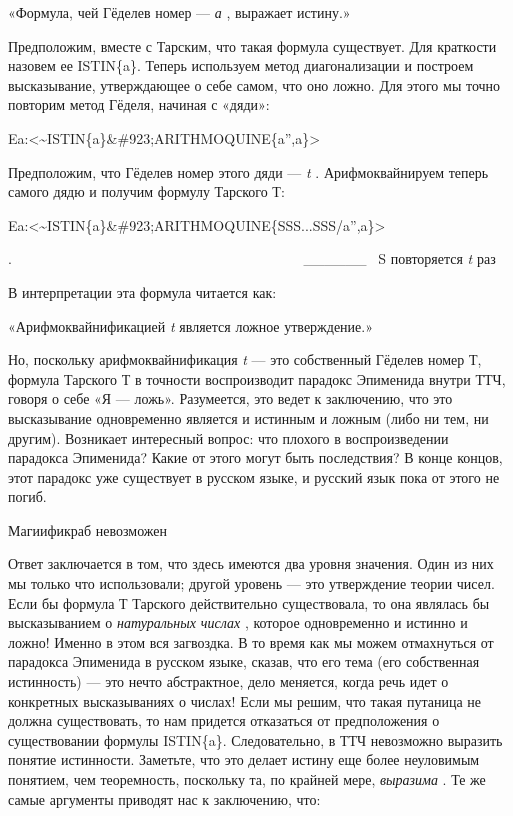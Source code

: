 \documentclass[../main.tex]{subfiles}
\begin{document}
«Формула, чей Гёделев номер --- \emph{а} , выражает истину.»

Предположим, вместе с Тарским, что такая формула существует. Для краткости назовем ее ISTIN\{a\}. Теперь используем метод диагонализации и построем высказывание, утверждающее о себе самом, что оно ложно. Для этого мы точно повторим метод Гёделя, начиная с «дяди»:

Ea:\textless\textasciitilde ISTIN\{a\}\&\#923;ARITHMOQUINE\{a'',a\}\textgreater{}

Предположим, что Гёделев номер этого дяди --- \emph{t} . Арифмоквайнируем теперь самого дядю и получим формулу Тарского Т:

Ea:\textless\textasciitilde ISTIN\{a\}\&\#923;ARITHMOQUINE\{SSS...SSS/a'',a\}\textgreater{}

.~~~~~~~~~~~~~~~~~~~~~~~~~~~~~~~~~~~~~~~~~ \textbar\_\_\_\_\_\_\textbar~ S повторяется \emph{t} раз

В интерпретации эта формула читается как:

«Арифмоквайнификацией \emph{t} является ложное утверждение.»

Но, поскольку арифмоквайнификация \emph{t} --- это собственный Гёделев номер Т, формула Тарского Т в точности воспроизводит парадокс Эпименида внутри ТТЧ, говоря о себе «Я --- ложь». Разумеется, это ведет к заключению, что это высказывание одновременно является и истинным и ложным (либо ни тем, ни другим). Возникает интересный вопрос: что плохого в воспроизведении парадокса Эпименида? Какие от этого могут быть последствия? В конце концов, этот парадокс уже существует в русском языке, и русский язык пока от этого не погиб.

Магиификраб невозможен

Ответ заключается в том, что здесь имеются два уровня значения. Один из них мы только что использовали; другой уровень --- это утверждение теории чисел. Если бы формула Т Тарского действительно существовала, то она являлась бы высказыванием о \emph{натуральных числах} , которое одновременно и истинно и ложно! Именно в этом вся загвоздка. В то время как мы можем отмахнуться от парадокса Эпименида в русском языке, сказав, что его тема (его собственная истинность) --- это нечто абстрактное, дело меняется, когда речь идет о конкретных высказываниях о числах! Если мы решим, что такая путаница не должна существовать, то нам придется отказаться от предположения о существовании формулы ISTIN\{a\}. Следовательно, в ТТЧ невозможно выразить понятие истинности. Заметьте, что это делает истину еще более неуловимым понятием, чем теоремность, поскольку та, по крайней мере, \emph{выразима} . Те же самые аргументы приводят нас к заключению, что:
\end{document}
